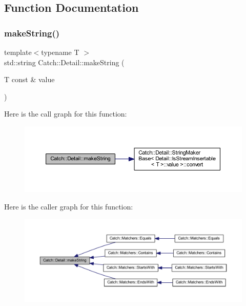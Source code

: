 \subsection{Function Documentation}
\hypertarget{namespace_catch_1_1_detail_aef46b4178e08758524d25d1d969a503c}{}\label{namespace_catch_1_1_detail_aef46b4178e08758524d25d1d969a503c} 
\subsubsection{\texorpdfstring{make\+String()}{makeString()}}
{\footnotesize\ttfamily template$<$typename T $>$ \\
std\+::string Catch\+::\+Detail\+::make\+String (\begin{DoxyParamCaption}\item[{T const \&}]{value }\end{DoxyParamCaption})}

Here is the call graph for this function\+:\nopagebreak
\begin{figure}[H]
\begin{center}
\leavevmode
\includegraphics[width=350pt]{namespace_catch_1_1_detail_aef46b4178e08758524d25d1d969a503c_cgraph}
\end{center}
\end{figure}
Here is the caller graph for this function\+:\nopagebreak
\begin{figure}[H]
\begin{center}
\leavevmode
\includegraphics[width=350pt]{namespace_catch_1_1_detail_aef46b4178e08758524d25d1d969a503c_icgraph}
\end{center}
\end{figure}
\hypertarget{namespace_catch_1_1_detail_ae9a44d574c4fbd18fabaaee05a433d88}{}\label{namespace_catch_1_1_detail_ae9a44d574c4fbd18fabaaee05a433d88} 
